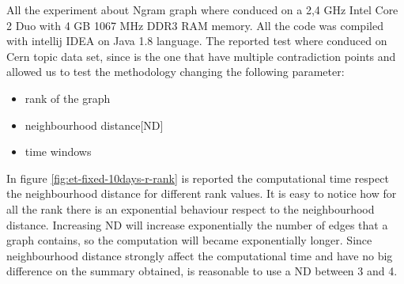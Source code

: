All the experiment about Ngram graph where conduced on a 2,4 GHz Intel Core 2 Duo with 4 GB 1067 MHz DDR3 RAM memory.
 All the code was compiled with intellij IDEA on Java 1.8 language. 
The reported test where conduced on Cern topic data set, since is the one that have multiple contradiction points and allowed us to test the methodology changing the following parameter:
\begin{itemize}
	\item rank of the graph
	\item neighbourhood distance[ND]
	\item time windows
\end{itemize}

In figure \ref{fig:et-fixed-10days-r-rank} is reported the computational time respect the neighbourhood distance for different rank values. 
It is easy to notice how for all the rank there is an exponential behaviour respect to the neighbourhood distance. 
Increasing ND will increase exponentially the number of edges that a graph contains, so the computation will became exponentially longer.
Since neighbourhood distance strongly affect the computational time and have no big difference on the summary obtained, is reasonable to use a ND between 3 and 4.

